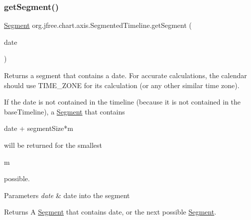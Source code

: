 \subsubsection{\texorpdfstring{get\+Segment()}{getSegment()}\hspace{0.1cm}{\footnotesize\ttfamily [2/2]}}
{\footnotesize\ttfamily \mbox{\hyperlink{classorg_1_1jfree_1_1chart_1_1axis_1_1_segmented_timeline_1_1_segment}{Segment}} org.\+jfree.\+chart.\+axis.\+Segmented\+Timeline.\+get\+Segment (\begin{DoxyParamCaption}\item[{Date}]{date }\end{DoxyParamCaption})}

Returns a segment that contains a date. For accurate calculations, the calendar should use T\+I\+M\+E\+\_\+\+Z\+O\+NE for its calculation (or any other similar time zone).

If the date is not contained in the timeline (because it is not contained in the base\+Timeline), a \mbox{\hyperlink{classorg_1_1jfree_1_1chart_1_1axis_1_1_segmented_timeline_1_1_segment}{Segment}} that contains 
\begin{DoxyCode}
date + segmentSize*m 
\end{DoxyCode}
 will be returned for the smallest 
\begin{DoxyCode}
m 
\end{DoxyCode}
 possible.


\begin{DoxyParams}{Parameters}
{\em date} & date into the segment\\
\hline
\end{DoxyParams}
\begin{DoxyReturn}{Returns}
A \mbox{\hyperlink{classorg_1_1jfree_1_1chart_1_1axis_1_1_segmented_timeline_1_1_segment}{Segment}} that contains date, or the next possible \mbox{\hyperlink{classorg_1_1jfree_1_1chart_1_1axis_1_1_segmented_timeline_1_1_segment}{Segment}}. 
\end{DoxyReturn}
\mbox{\label{classorg_1_1jfree_1_1chart_1_1axis_1_1_segmented_timeline_a8c4c4826474f82c2891737fa3b66f414}} 
